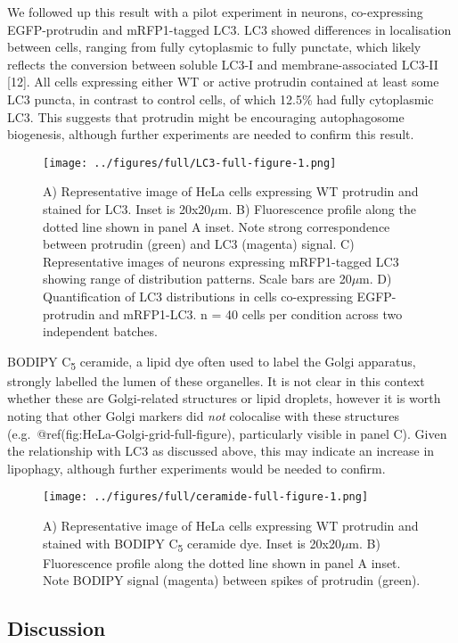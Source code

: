 \documentclass[
  12pt,
  a4paper,
]{article}
\begin{document}
We followed up this result with a pilot experiment in neurons,
co-expressing EGFP-protrudin and mRFP1-tagged LC3. LC3 showed
differences in localisation between cells, ranging from fully
cytoplasmic to fully punctate, which likely reflects the conversion
between soluble LC3-I and membrane-associated LC3-II {[}12{]}. All cells
expressing either WT or active protrudin contained at least some LC3
puncta, in contrast to control cells, of which 12.5\% had fully
cytoplasmic LC3. This suggests that protrudin might be encouraging
autophagosome biogenesis, although further experiments are needed to
confirm this result.

\begin{figure}
\centering
\texttt{[image: ../figures/full/LC3-full-figure-1.png]}
\caption{A) Representative image of HeLa cells expressing WT protrudin
and stained for LC3. Inset is 20x20\(\mu\)m. B) Fluorescence profile
along the dotted line shown in panel A inset. Note strong correspondence
between protrudin (green) and LC3 (magenta) signal. C) Representative
images of neurons expressing mRFP1-tagged LC3 showing range of
distribution patterns. Scale bars are 20\(\mu\)m. D) Quantification of
LC3 distributions in cells co-expressing EGFP-protrudin and mRFP1-LC3. n
= 40 cells per condition across two independent batches.}
\end{figure}

BODIPY C\textsubscript{5} ceramide, a lipid dye often used to label the
Golgi apparatus, strongly labelled the lumen of these organelles. It is
not clear in this context whether these are Golgi-related structures or
lipid droplets, however it is worth noting that other Golgi markers did
\emph{not} colocalise with these structures
(e.g.~@ref(fig:HeLa-Golgi-grid-full-figure), particularly visible in
panel C). Given the relationship with LC3 as discussed above, this may
indicate an increase in lipophagy, although further experiments would be
needed to confirm.

\begin{figure}
\centering
\texttt{[image: ../figures/full/ceramide-full-figure-1.png]}
\caption{A) Representative image of HeLa cells expressing WT protrudin
and stained with BODIPY C\textsubscript{5} ceramide dye. Inset is
20x20\(\mu\)m. B) Fluorescence profile along the dotted line shown in
panel A inset. Note BODIPY signal (magenta) between spikes of protrudin
(green).}
\end{figure}

\hypertarget{discussion}{%
\subsection{Discussion}\label{discussion}}
\end{document}
